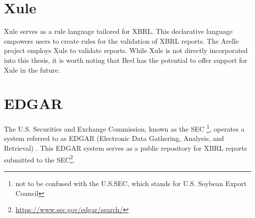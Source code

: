 \section{Xule}
Xule\cite{xule} serves as a rule language tailored for XBRL. 
This declarative language empowers users to create rules for the validation of XBRL reports. 
The Arelle project employs Xule to validate reports. 
While Xule is not directly incorporated into this thesis, it is worth noting that Brel has the potential to offer support for Xule in the future.


\section{EDGAR}
\label{sec:edgar}
The U.S. Securities and Exchange Commission, known as the SEC
\footnote{not to be confused with the U.S.SEC, which stands for U.S. Soybean Export Council},
operates a system referred to as EDGAR (Electronic Data Gathering, Analysis, and Retrieval) \cite{sec_edgar}. 
This EDGAR system serves as a public repository for XBRL reports submitted to the SEC\footnote{\url{https://www.sec.gov/edgar/search/}}.

